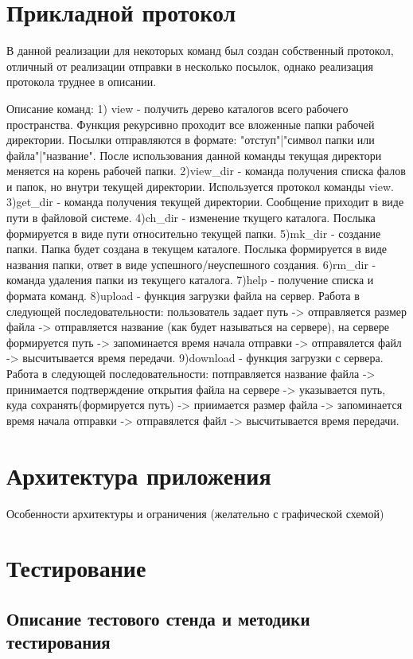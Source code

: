 \documentclass[12pt,a4paper]{report}
\begin{document}
\section{Прикладной протокол}
\label{protocol_tcp}
В данной реализации для некоторых команд был создан собственный протокол,
отличный от реализации отправки в несколько посылок, однако реализация протокола труднее в описании.

Описание команд:
1) view - получить дерево каталогов всего рабочего пространства. Функция рекурсивно проходит все вложенные
папки рабочей директории. Посылки отправляются в формате: "отступ"|"символ папки или файла"|"название". После использования данной команды текущая директори меняется на корень рабочей папки.
2)view_dir - команда получения списка фалов и папок, но внутри текущей директории. Используется протокол команды view.
3)get_dir - команда получения текущей директории. Сообщение приходит в виде пути в файловой системе.
4)ch_dir - изменение ткущего каталога. Послыка формируется в виде пути относительно текущей папки.
5)mk_dir - создание папки. Папка будет создана в текущем каталоге. Послыка формируется в виде названия папки, ответ в виде успешного/неуспешного создания.
6)rm_dir - команда удаления папки из текущего каталога. 
7)help - получение списка и формата команд.
8)upload - функция загрузки файла на сервер. Работа в следующей последовательности: пользователь задает путь -> отправляется размер файла -> отправляется название (как будет называться на сервере), на сервере формируется путь -> запоминается время начала отправки -> отправялется файл -> высчитывается время передачи.
9)download - функция загрузки с сервера. Работа в следующей последовательности: потправляется название файла -> принимается подтверждение открытия файла на сервере -> указывается путь, куда сохранять(формируется путь) -> приимается размер файла -> запоминается время начала отправки -> отправялется файл -> высчитывается время передачи.

\section{Архитектура приложения}
Особенности архитектуры и ограничения (желательно с графической схемой) 

\section{Тестирование}
\subsection{Описание тестового стенда и методики тестирования}
\end{document}
